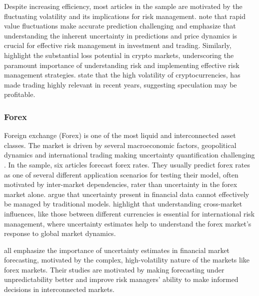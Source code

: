 Despite increasing efficiency, most articles in the sample are motivated by the fluctuating volatility and its implications for risk management. \textcite{Golnari2024Cryptocurrency} note that rapid value fluctuations make accurate prediction challenging and emphasize that understanding the inherent uncertainty in predictions and price dynamics is crucial for effective risk management in investment and trading. Similarly, 
\textcite{Almeida2024RiskForecasting} highlight the substantial loss potential in crypto markets, underscoring the paramount importance of understanding risk and implementing effective risk management strategies. \textcite{cocco2021predictions} state that the high volatility of cryptocurrencies, has made trading highly relevant in recent years, suggesting speculation may be profitable. 


\subsubsection{Forex}
Foreign exchange (Forex) is one of the most liquid and interconnected asset classes. The market is driven by several macroeconomic factors, geopolitical dynamics and international trading making uncertainty quantification challenging \parencite{Rossi2013ExchangeRP}.
In the sample, six articles forecast forex rates. They usually predict forex rates as one of several different application scenarios for testing their model, often motivated by inter-market dependencies, rater than uncertainty in the forex market alone. 
\textcite{li2010stochastic} argue that uncertainty present in financial data cannot effectively be managed by traditional models. 
\textcite{cao2019multi} highlight that understanding cross-market influences, like those between different currencies is essential for international risk management, where uncertainty estimates help to understand the forex market's response to global market dynamics. 

\textcite{Papaioannou2022gpr, Platanios2014gpr, 
tang2024period} all emphasize the importance of uncertainty estimates in financial market forecasting, motivated by the complex, high-volatility nature of the markets like forex markets. Their studies are motivated by making forecasting under unpredictability better and improve risk managers' ability to make informed decisions in interconnected markets.  


